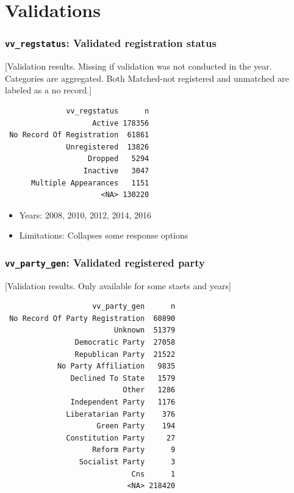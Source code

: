 \documentclass[10pt,article,oneside]{memoir}
\theoremstyle{definition}
\begin{document}
\newpage

\hypertarget{validations}{%
\section{Validations}\label{validations}}

\hypertarget{vv_regstatus-validated-registration-status}{%
\subsubsection{\texorpdfstring{\texttt{vv\_regstatus}: Validated
registration
status}{vv\_regstatus: Validated registration status}}\label{vv_regstatus-validated-registration-status}}

{[}Validation results. Missing if validation was not conducted in the
year. Categories are aggregated. Both Matched-not registered and
unmatched are labeled as a no record.{]}

\begin{verbatim}
              vv_regstatus      n
                    Active 178356
 No Record Of Registration  61861
              Unregistered  13826
                   Dropped   5294
                  Inactive   3047
      Multiple Appearances   1151
                      <NA> 130220
\end{verbatim}

\begin{itemize}
\tightlist
\item
  Years: 2008, 2010, 2012, 2014, 2016
\item
  Limitations: Collapses some response options
\end{itemize}

\hypertarget{vv_party_gen-validated-registered-party}{%
\subsubsection{\texorpdfstring{\texttt{vv\_party\_gen}: Validated
registered
party}{vv\_party\_gen: Validated registered party}}\label{vv_party_gen-validated-registered-party}}

{[}Validation results. Only available for some staets and years{]}

\begin{verbatim}
                    vv_party_gen      n
 No Record Of Party Registration  60890
                         Unknown  51379
                Democratic Party  27058
                Republican Party  21522
            No Party Affiliation   9835
               Declined To State   1579
                           Other   1286
               Independent Party   1176
              Liberatarian Party    376
                     Green Party    194
              Constitution Party     27
                    Reform Party      9
                 Socialist Party      3
                             Cns      1
                            <NA> 218420
\end{verbatim}
\end{document}
